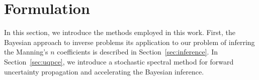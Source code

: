 \section{Formulation}
\label{sec:formu}
In this section, we introduce the methods employed in this work.
First, the Bayesian approach to inverse problems its application to our problem of inferring the Manning's $n$ coefficients is described in Section~\ref{sec:inference}.
In Section~\ref{sec:uqpce}, we introduce
a stochastic spectral method for forward uncertainty propagation and accelerating the Bayesian inference.





